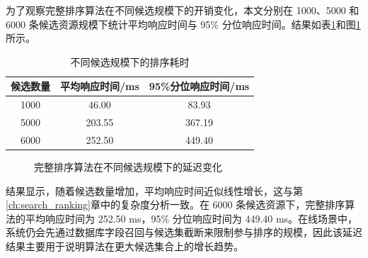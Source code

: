 为了观察完整排序算法在不同候选规模下的开销变化，本文分别在 1000、5000 和 6000 条候选资源规模下统计平均响应时间与 95\% 分位响应时间。结果如表\ref{tab:ranking_latency}和图\ref{fig:ranking_latency_curve}所示。

\begin{table}[htbp]
    \linespread{1.45}
    \songti
    \centering
    \caption{不同候选规模下的排序耗时}\label{tab:ranking_latency}
    \begin{tabular}{|c|c|c|}
        \hline
        候选数量 & 平均响应时间/ms & 95\%分位响应时间/ms \\ \hline
        1000 & 46.00     & 83.93         \\ \hline
        5000 & 203.55    & 367.19        \\ \hline
        6000 & 252.50    & 449.40        \\ \hline
    \end{tabular}
\end{table}

\begin{figure}[htbp]
    \centering
    \caption{完整排序算法在不同候选规模下的延迟变化}
    \label{fig:ranking_latency_curve}
\end{figure}

结果显示，随着候选数量增加，平均响应时间近似线性增长，这与第\ref{ch:search_ranking}章中的复杂度分析一致。在 6000 条候选资源下，完整排序算法的平均响应时间为 252.50 ms，95\% 分位响应时间为 449.40 ms。在线场景中，系统仍会先通过数据库字段召回与候选集截断来限制参与排序的规模，因此该延迟结果主要用于说明算法在更大候选集合上的增长趋势。


